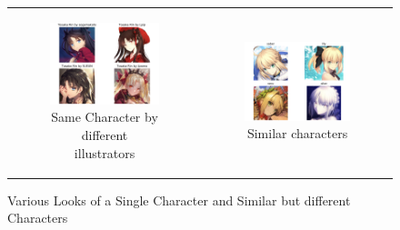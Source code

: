 \documentclass[11.5pt]{article}
\begin{document}
    \begin{figure}[!ht]
        \begin{center}
            \begin{tabular}[c]{cc}
                \begin{subfigure}[h]{0.4\linewidth}
                    \centering
                    \includegraphics[width=0.8\linewidth, scale=1]{./images/tosaka_grid.png}
                    \caption{Same Character by different illustrators}
                \end{subfigure} & 
                \begin{subfigure}[h]{0.4\linewidth}
                    \centering
                    \includegraphics[width=0.8\linewidth, scale=1]{./images/saber_grid.png}
                    \caption{Similar characters}
                \end{subfigure}
            \end{tabular}
        \end{center}
        \caption{Various Looks of a Single Character and Similar but different Characters}
    \end{figure}
\end{document}
